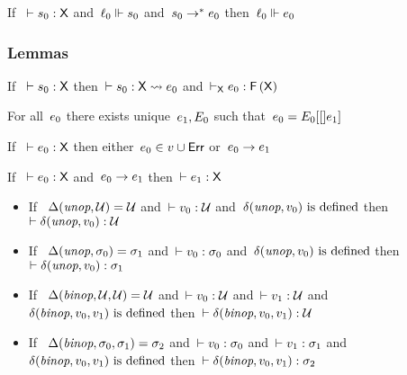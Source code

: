 \documentclass[nonacm,10pt]{acmart}
\begin{document}
\begin{theorem}
  If\ $~\vdash s_0 : \mathsf{X}$
  and\ $\ell_0 \Vdash s_0$
  and\ $s_0 \rightarrow^{*} e_0$
  then\ $\ell_0 \Vdash e_0$
\end{theorem}


\subsubsection{Lemmas}

\begin{lemma}
  If\ $~\vdash s_0 : \mathsf{X}$
  then\ $\vdash s_0 : \mathsf{X} \rightsquigarrow e_0$
  and\ $\vdash_{\mathsf{X}} e_0 : \mathsf{F}\,(\mathsf{X})$
\end{lemma}

\begin{lemma}[decomposition]
  For all\ $e_0$
  there exists unique\ $e_1, E_0$
  such that\ $e_0 = E_0[[]e_1]$
\end{lemma}

\begin{lemma}
  If\ $~\vdash e_0 : \mathsf{X}$
  then either\ $e_0 \in v \cup \mathsf{Err}$
  or\ $e_0 \rightarrow e_1$
\end{lemma}

\begin{lemma}
  If\ $~\vdash e_0 : \mathsf{X}$
  and\ $e_0 \rightarrow e_1$
  then\ $\vdash e_1 : \mathsf{X}$
\end{lemma}

\begin{lemma}\leavevmode
  \begin{itemize}
    \item
      If\ $~\Delta(\textit{unop}, \mathcal{U}) = \mathcal{U}$
      and\ $\vdash v_0 : \mathcal{U}$
      and\ $\delta(\textit{unop}, v_0) \mbox{ is defined}$
      then\ $\vdash \delta(\textit{unop}, v_0) : \mathcal{U}$
    \item
      If\ $~\Delta(\textit{unop}, \sigma_0) = \sigma_1$
      and\ $\vdash v_0 : \sigma_0$
      and\ $\delta(\textit{unop}, v_0) \mbox{ is defined}$
      then\ $\vdash \delta(\textit{unop}, v_0) : \sigma_1$
    \item
      If\ $~\Delta(\textit{binop}, \mathcal{U}, \mathcal{U}) = \mathcal{U}$
      and\ $\vdash v_0 : \mathcal{U}$
      and\ $\vdash v_1 : \mathcal{U}$
      and\ $\delta(\textit{binop}, v_0, v_1) \mbox{ is defined}$
      then\ $\vdash \delta(\textit{binop}, v_0, v_1) : \mathcal{U}$
    \item
      If\ $~\Delta(\textit{binop}, \sigma_0, \sigma_1) = \sigma_2$
      and\ $\vdash v_0 : \sigma_0$
      and\ $\vdash v_1 : \sigma_1$
      and\ $\delta(\textit{binop}, v_0, v_1) \mbox{ is defined}$
      then\ $\vdash \delta(\textit{binop}, v_0, v_1) : \sigma_2$
  \end{itemize}
\end{lemma}
\end{document}
